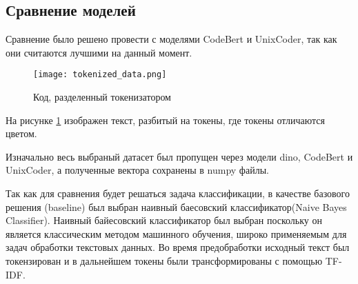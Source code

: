 \documentclass[../part_3.tex]{subfiles}
\begin{document}
\subsection{Сравнение моделей}
\par Сравнение было решено провести с моделями CodeBert\cite{feng2020codebertpretrainedmodelprogramming} и UnixCoder\cite{guo2022unixcoder}, так как они считаются лучшими на данный момент.
\begin{figure}[H]
	\centering
	\texttt{[image: tokenized\_data.png]}
	\caption{Код, разделенный токенизатором}
	\label{fig:tokenized}
\end{figure}
\par На рисунке \ref{fig:tokenized} изображен текст, разбитый на токены, где токены отличаются цветом.
\par Изначально весь выбраный датасет был пропущен через модели \acrshort{dino}, CodeBert и UnixCoder, а полученные вектора сохранены в numpy файлы.
\par Так как для сравнения будет решаться задача классификации, в качестве базового решения (baseline) был выбран наивный баесовский классификатор(Naive Bayes Classifier). Наивный байесовский классификатор был выбран поскольку он является классическим методом машинного обучения, широко применяемым для задач обработки текстовых данных. Во время предобработки исходный текст был токензирован и в дальнейшем токены были трансформированы с помощью TF-IDF\@.
\end{document}
